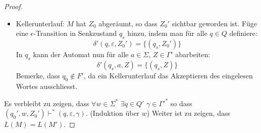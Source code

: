 \begin{proof}
\begin{itemize}
  \item Kellerunterlauf: $M$ hat $Z_0$ abgeräumt, so dass $Z_0'$
    sichtbar geworden ist. Füge eine $\epsilon$-Transition in
     Senkzustand $q_s$ hinzu, indem man für alle $q\in Q$ definiere:\\
    \[\delta' (q, \varepsilon, Z_0') = \{ (q_s, Z_0') \} \]
  In $q_s$ kann der Automat nun für alle $a\in\Sigma$, $Z\in \Gamma'$ abarbeiten:\\
    \[\delta' (q_s, a, Z) = \{ (q_s, Z) \}\]   %
    Bemerke, dass $q_0 \not \in F'$, da ein Kellerunterlauf
    das Akzeptieren des eingelesen Wortes ausschliesst.
  \end{itemize}

  Es verbleibt zu zeigen, dass $\forall w\in \Sigma^*$ $\exists q\in Q'$
  $\gamma\in\Gamma'^*$ so dass $(q_0', w, Z_0') \vdash^* (q,
  \varepsilon, \gamma)$. (Induktion über $w$) Weiter ist zu zeigen,
  dass $L (M) = L (M')$.
\end{proof}

